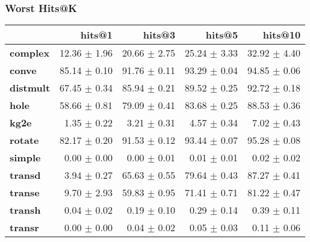 \documentclass{article}
\begin{document}
    \subsubsection{Worst Hits@K}
    \begin{center}
    \begin{tabular}{lrrrr}
\toprule
{} &        hits@1 &        hits@3 &        hits@5 &       hits@10 \\
\midrule
\textbf{complex } &  12.36 $\pm$ 1.96 &  20.66 $\pm$ 2.75 &  25.24 $\pm$ 3.33 &  32.92 $\pm$ 4.40 \\
\textbf{conve   } &  85.14 $\pm$ 0.10 &  91.76 $\pm$ 0.11 &  93.29 $\pm$ 0.04 &  94.85 $\pm$ 0.06 \\
\textbf{distmult} &  67.45 $\pm$ 0.34 &  85.94 $\pm$ 0.21 &  89.52 $\pm$ 0.25 &  92.72 $\pm$ 0.18 \\
\textbf{hole    } &  58.66 $\pm$ 0.81 &  79.09 $\pm$ 0.41 &  83.68 $\pm$ 0.25 &  88.53 $\pm$ 0.36 \\
\textbf{kg2e    } &   1.35 $\pm$ 0.22 &   3.21 $\pm$ 0.31 &   4.57 $\pm$ 0.34 &   7.02 $\pm$ 0.43 \\
\textbf{rotate  } &  82.17 $\pm$ 0.20 &  91.53 $\pm$ 0.12 &  93.44 $\pm$ 0.07 &  95.28 $\pm$ 0.08 \\
\textbf{simple  } &   0.00 $\pm$ 0.00 &   0.00 $\pm$ 0.01 &   0.01 $\pm$ 0.01 &   0.02 $\pm$ 0.02 \\
\textbf{transd  } &   3.94 $\pm$ 0.27 &  65.63 $\pm$ 0.55 &  79.64 $\pm$ 0.43 &  87.27 $\pm$ 0.41 \\
\textbf{transe  } &   9.70 $\pm$ 2.93 &  59.83 $\pm$ 0.95 &  71.41 $\pm$ 0.71 &  81.22 $\pm$ 0.47 \\
\textbf{transh  } &   0.04 $\pm$ 0.02 &   0.19 $\pm$ 0.10 &   0.29 $\pm$ 0.14 &   0.39 $\pm$ 0.11 \\
\textbf{transr  } &   0.00 $\pm$ 0.00 &   0.04 $\pm$ 0.02 &   0.05 $\pm$ 0.03 &   0.11 $\pm$ 0.06 \\
\bottomrule
\end{tabular}

    \end{center}
\end{document}
